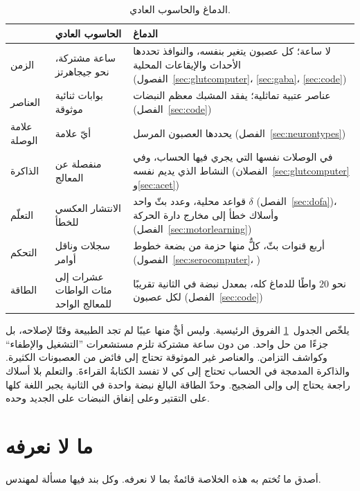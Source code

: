 \begin{table}[t]
\centering
\footnotesize
\setlength{\tabcolsep}{4pt}
\renewcommand{\arraystretch}{1.15}
\begin{tabular}{>{\raggedright}p{2.2cm}>{\raggedright}p{4.2cm}>{\raggedright\arraybackslash}p{6.6cm}}
\toprule
& الحاسوب العادي & الدماغ \\
\midrule
الزمن & ساعة مشتركة، نحو جيجاهرتز & لا ساعة؛ كل عصبون يتغير بنفسه، والنوافذ تحددها الأحداث والإيقاعات المحلية (الفصول~\ref{sec:glutcomputer}، \ref{sec:gaba}، \ref{sec:code}) \\
العناصر & بوابات ثنائية موثوقة & عناصر عتبية تماثلية؛ يفقد المشبك معظم النبضات (الفصل~\ref{sec:code}) \\
علامة الوصلة & أيّ علامة & يحددها العصبون المرسل (الفصل~\ref{sec:neurontypes}) \\
الذاكرة & منفصلة عن المعالج & في الوصلات نفسها التي يجري فيها الحساب، وفي النشاط الذي يديم نفسه (الفصلان~\ref{sec:glutcomputer} و\ref{sec:acet}) \\
التعلّم & الانتشار العكسي للخطأ & قواعد محلية، وعدد بثّ واحد $\delta$ (الفصل~\ref{sec:dofa})، وأسلاك خطأ إلى مخارج دارة الحركة (الفصل~\ref{sec:motorlearning}) \\
التحكم & سجلات وناقل أوامر & أربع قنوات بثّ، كلٌّ منها حزمة من بضعة خطوط (الفصول~\ref{sec:serocomputer}، \babelsublr{\ref{sec:dofa}--\ref{sec:acet}}) \\
الطاقة & عشرات إلى مئات الواطات للمعالج الواحد & نحو $20$ واطًا للدماغ كله، بمعدل نبضة في الثانية تقريبًا لكل عصبون (الفصل~\ref{sec:code}) \\
\bottomrule
\end{tabular}
\caption{الدماغ والحاسوب العادي.}
\label{tab:computer}
\end{table}

يلخّص الجدول~\ref{tab:computer} الفروق الرئيسية. وليس أيٌّ منها عيبًا لم تجد الطبيعة وقتًا لإصلاحه، بل جزءًا من حل واحد. من دون ساعة مشتركة تلزم مستشعرات ”التشغيل والإطفاء“ وكواشف التزامن. والعناصر غير الموثوقة تحتاج إلى فائض من العصبونات الكثيرة. والذاكرة المدمجة في الحساب تحتاج إلى  كي لا تفسد الكتابةُ القراءةَ. والتعلم بلا أسلاك راجعة يحتاج إلى  وإلى الضجيج. وحدّ الطاقة البالغ نبضة واحدة في الثانية يجبر اللغة كلها على التقتير وعلى إنفاق النبضات على الجديد وحده.

\section{ما لا نعرفه}

أصدق ما تُختم به هذه الخلاصة قائمةٌ بما لا نعرفه. وكل بند فيها مسألة لمهندس.

